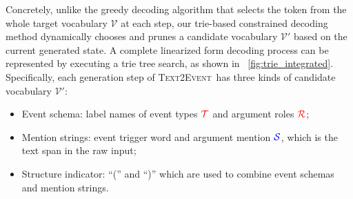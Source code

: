 \documentclass[11pt,a4paper]{article}
\newcommand\modelname{\textsc{Text2Event}}
\begin{document}
Concretely, unlike the greedy decoding algorithm that selects the token from the whole target vocabulary $\mathcal{V}$ at each step, our trie-based constrained decoding method dynamically chooses and prunes a candidate vocabulary $\mathcal{V'}$ based on the current generated state.
A complete linearized form decoding process can be represented by executing a trie tree search, as shown in \figurename~\ref{fig:trie_integrated}.
Specifically, each generation step of \modelname\, has three kinds of candidate vocabulary $\mathcal{V'}$:
\begin{itemize}
    \item Event schema: label names of event types ${\color{red}\mathcal{T}}$ and argument roles ${\color{red}\mathcal{R}}$;
    \item Mention strings: event trigger word and argument mention ${\color{blue}\mathcal{S}}$, which is the text span in the raw input;
    \item Structure indicator: ``('' and ``)'' which are used to combine event schemas and mention strings.
\end{itemize}
\end{document}

